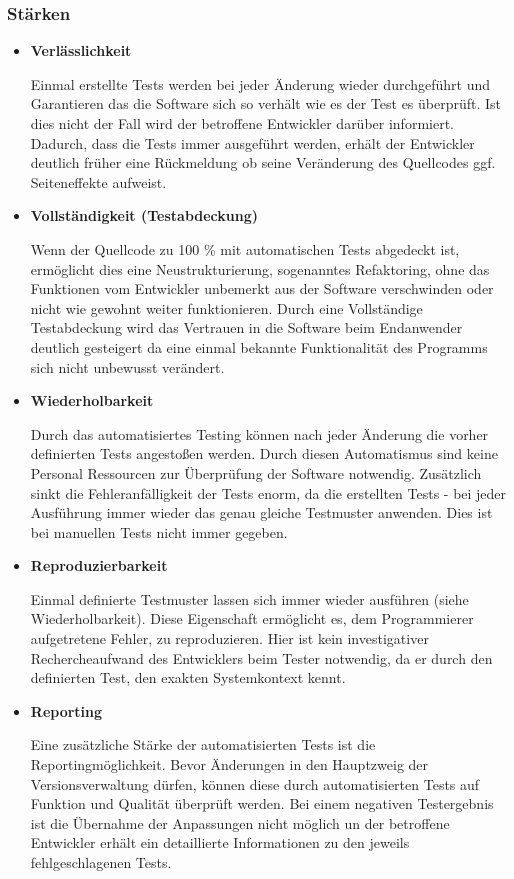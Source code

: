\subsubsection{Stärken}
\begin{itemize}	
	\item \textbf{Verlässlichkeit}
	
	Einmal erstellte Tests werden bei jeder Änderung wieder durchgeführt und Garantieren das die Software sich so verhält wie es der Test es überprüft. Ist dies nicht der Fall wird der betroffene Entwickler darüber informiert. Dadurch, dass die Tests immer ausgeführt werden, erhält der Entwickler deutlich früher eine Rückmeldung ob seine Veränderung des Quellcodes ggf. Seiteneffekte aufweist.
	
	\item \textbf{Vollständigkeit (Testabdeckung)}
	
	Wenn der Quellcode zu 100 \% mit automatischen Tests abgedeckt ist, ermöglicht dies eine Neustrukturierung, sogenanntes Refaktoring, ohne das Funktionen vom Entwickler unbemerkt aus der Software verschwinden oder nicht wie gewohnt weiter funktionieren. Durch eine Vollständige Testabdeckung wird das Vertrauen in die Software beim Endanwender deutlich gesteigert da eine einmal bekannte Funktionalität des Programms sich nicht unbewusst verändert.
	
	\item \textbf{Wiederholbarkeit}
	
	Durch das automatisiertes Testing können nach jeder Änderung die vorher definierten Tests angestoßen werden. Durch diesen Automatismus sind keine Personal Ressourcen zur Überprüfung der Software notwendig. Zusätzlich sinkt die Fehleranfälligkeit der Tests enorm, da die erstellten Tests - bei jeder Ausführung immer wieder das genau gleiche Testmuster anwenden. Dies ist bei manuellen Tests nicht immer gegeben.
	
	\item \textbf{Reproduzierbarkeit}
	
	Einmal definierte Testmuster lassen sich immer wieder ausführen (siehe Wiederholbarkeit). Diese Eigenschaft ermöglicht es, dem Programmierer aufgetretene Fehler, zu reproduzieren. Hier ist kein investigativer Rechercheaufwand des Entwicklers beim Tester notwendig, da er durch den definierten Test, den exakten Systemkontext kennt.
	
	\item \textbf{Reporting}
	
	Eine zusätzliche Stärke der automatisierten Tests ist die Reportingmöglichkeit. Bevor Änderungen in den Hauptzweig der Versionsverwaltung dürfen, können diese durch automatisierten Tests auf Funktion und Qualität überprüft werden. Bei einem negativen Testergebnis ist die Übernahme der Anpassungen nicht möglich un der betroffene Entwickler erhält ein detaillierte Informationen zu den jeweils fehlgeschlagenen Tests.
	

\end{itemize}
